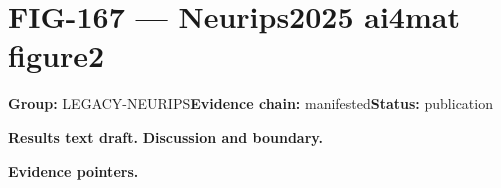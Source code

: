 \clearpage
\section{FIG-167 --- Neurips2025 ai4mat figure2}
\label{figpage:fig-167}
\textbf{Group:} LEGACY-NEURIPS\quad \textbf{Evidence chain:} manifested\quad \textbf{Status:} publication

\textbf{Results text draft.} 
\textbf{Discussion and boundary.} 


\textbf{Evidence pointers.}



\vfill
